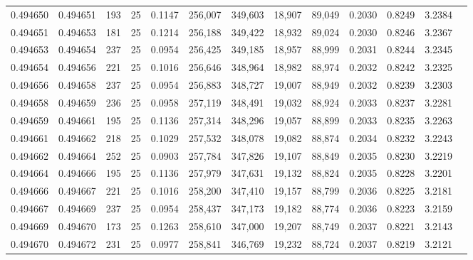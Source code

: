 \begin{tabular}{rrrrrrrrrrrrr}
0.494650 & 0.494651 &   193 &  25 &                                     0.1147 & 256,007 & 349,603 &  18,907 &  89,049 & 0.2030 & 0.8249 & 3.2384 \\
0.494651 & 0.494653 &   181 &  25 &                                     0.1214 & 256,188 & 349,422 &  18,932 &  89,024 & 0.2030 & 0.8246 & 3.2367 \\
0.494653 & 0.494654 &   237 &  25 &                                     0.0954 & 256,425 & 349,185 &  18,957 &  88,999 & 0.2031 & 0.8244 & 3.2345 \\
0.494654 & 0.494656 &   221 &  25 &                                     0.1016 & 256,646 & 348,964 &  18,982 &  88,974 & 0.2032 & 0.8242 & 3.2325 \\
0.494656 & 0.494658 &   237 &  25 &                                     0.0954 & 256,883 & 348,727 &  19,007 &  88,949 & 0.2032 & 0.8239 & 3.2303 \\
0.494658 & 0.494659 &   236 &  25 &                                     0.0958 & 257,119 & 348,491 &  19,032 &  88,924 & 0.2033 & 0.8237 & 3.2281 \\
0.494659 & 0.494661 &   195 &  25 &                                     0.1136 & 257,314 & 348,296 &  19,057 &  88,899 & 0.2033 & 0.8235 & 3.2263 \\
0.494661 & 0.494662 &   218 &  25 &                                     0.1029 & 257,532 & 348,078 &  19,082 &  88,874 & 0.2034 & 0.8232 & 3.2243 \\
0.494662 & 0.494664 &   252 &  25 &                                     0.0903 & 257,784 & 347,826 &  19,107 &  88,849 & 0.2035 & 0.8230 & 3.2219 \\
0.494664 & 0.494666 &   195 &  25 &                                     0.1136 & 257,979 & 347,631 &  19,132 &  88,824 & 0.2035 & 0.8228 & 3.2201 \\
0.494666 & 0.494667 &   221 &  25 &                                     0.1016 & 258,200 & 347,410 &  19,157 &  88,799 & 0.2036 & 0.8225 & 3.2181 \\
0.494667 & 0.494669 &   237 &  25 &                                     0.0954 & 258,437 & 347,173 &  19,182 &  88,774 & 0.2036 & 0.8223 & 3.2159 \\
0.494669 & 0.494670 &   173 &  25 &                                     0.1263 & 258,610 & 347,000 &  19,207 &  88,749 & 0.2037 & 0.8221 & 3.2143 \\
0.494670 & 0.494672 &   231 &  25 &                                     0.0977 & 258,841 & 346,769 &  19,232 &  88,724 & 0.2037 & 0.8219 & 3.2121 \\

\end{tabular}
